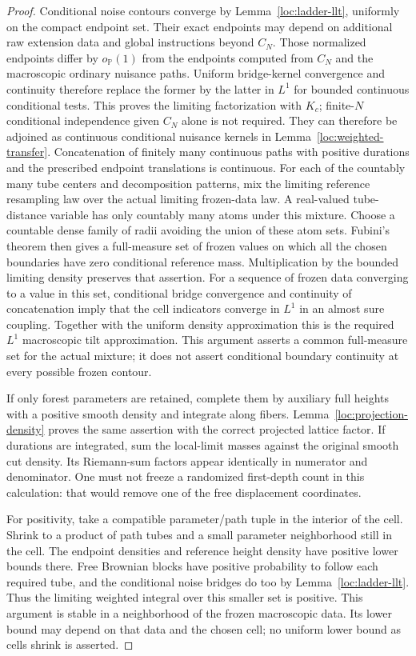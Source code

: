 \begin{proof}
Conditional noise contours converge by
Lemma~\ref{loc:ladder-llt}, uniformly on the compact endpoint set.
Their exact endpoints may depend on additional raw extension data and
global instructions beyond $C_N$.  Those normalized endpoints differ by
$o_{\mathbb P}(1)$ from the endpoints computed from $C_N$ and the
macroscopic ordinary nuisance paths.  Uniform bridge-kernel convergence
and continuity therefore replace the former by the latter in $L^1$
for bounded continuous conditional tests.  This proves the limiting
factorization with $K_c$; finite-$N$ conditional independence given
$C_N$ alone is not required.
They can therefore be adjoined as continuous conditional nuisance
kernels in Lemma~\ref{loc:weighted-transfer}.  Concatenation of finitely
many continuous paths with positive durations and the prescribed endpoint
translations is continuous.  For each of the countably many tube centers
and decomposition patterns, mix the limiting reference resampling law
over the actual limiting frozen-data law.  A real-valued tube-distance
variable has only countably many atoms under this mixture.  Choose a
countable dense family of radii avoiding the union of these atom sets.
Fubini's theorem then gives a full-measure set of frozen values on which
all the chosen boundaries have zero conditional reference mass.
Multiplication by the bounded limiting density preserves that assertion.
For a sequence of frozen data converging to a value in this set,
conditional bridge convergence and continuity of concatenation imply
that the cell indicators converge in $L^1$ in an almost sure coupling.
Together with the uniform density approximation this is the required
$L^1$ macroscopic tilt approximation.  This argument asserts a common
full-measure set for the actual mixture; it does not assert conditional
boundary continuity at every possible frozen contour.

If only forest parameters are retained, complete them by auxiliary full
heights with a positive smooth density and integrate along fibers.
Lemma~\ref{loc:projection-density} proves the same assertion with the
correct projected lattice factor.  If durations are integrated, sum the
local-limit masses against the original smooth cut density.  Its
Riemann-sum factors appear identically in numerator and denominator.
One must not freeze a randomized first-depth count in this calculation:
that would remove one of the free displacement coordinates.

For positivity, take a compatible parameter/path tuple in the interior
of the cell.  Shrink to a product of path tubes and a small parameter
neighborhood still in the cell.  The endpoint densities and reference
height density have positive lower bounds there.  Free Brownian blocks
have positive probability to follow each required tube, and the
conditional noise bridges do too by
Lemma~\ref{loc:ladder-llt}.  Thus the limiting weighted integral over
this smaller set is positive.  This argument is stable in a neighborhood
of the frozen macroscopic data.  Its lower bound may depend on that data
and the chosen cell; no uniform lower bound as cells shrink is asserted.
\end{proof}

